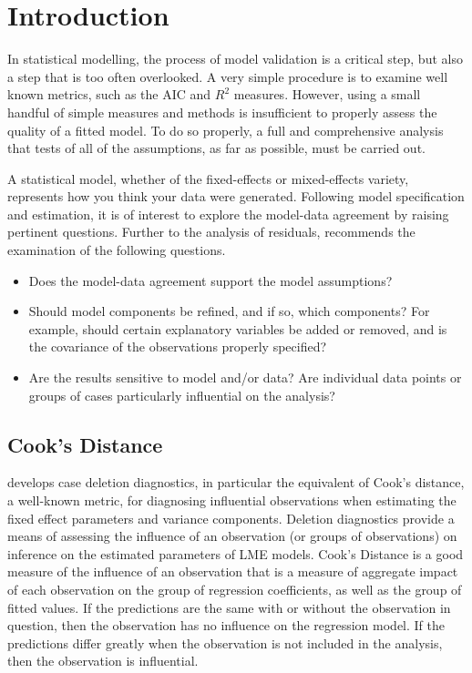 \section{Introduction}
In statistical modelling, the process of model validation is a critical step, but also a step that is too often overlooked. A very simple procedure is to examine well known
metrics, such as the AIC and $R^2$ measures. However, using a small handful of simple measures and methods is insufficient to properly assess the quality of a fitted model. To do so properly, a full and comprehensive
analysis that tests of all of the assumptions, as far as possible, must be carried out. 

A statistical model, whether of the fixed-effects or mixed-effects variety, represents how you think your data were generated. Following model specification and estimation, it is of interest to explore the model-data
agreement by raising pertinent questions. Further to the analysis of residuals, \citet{schab} recommends the examination of the following questions.
\begin{itemize}
	\item Does the model-data agreement support the model assumptions?
	\item Should model components be refined, and if so, which components? For example, should certain explanatory variables
	be added or removed, and is the covariance of the observations properly specified?
	\item Are the results sensitive to model and/or data? Are individual data points or groups of cases particularly
	influential on the analysis?
\end{itemize}
\newpage





\newpage
\subsection{Cook's Distance}
\citet{CPJ} develops  case deletion diagnostics, in particular the equivalent of  Cook's distance, a well-known metric, for diagnosing influential observations when estimating the fixed effect parameters and variance components. Deletion diagnostics provide a means of assessing the influence of an observation (or groups of observations) on inference on the estimated parameters of LME models. 
Cook's Distance is a good measure of the influence of an observation that is a measure of aggregate impact of each observation on the group of regression coefficients, as well as the group of fitted values.
If the predictions are the same with or without the observation in question, then the observation has no influence on the regression model. If the predictions differ greatly when the observation is not included in the analysis, then the observation is influential.


